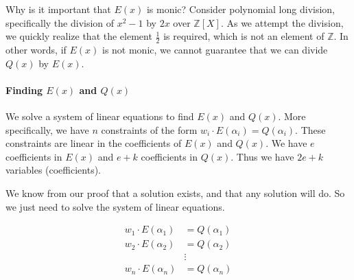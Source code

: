 \begin{bclogo}[logo=\bcquestion]{Why is it important that $E(x)$ is monic?}
    Consider polynomial long division, specifically 
    the division of $x^2-1$ by $2x$ over $\mathbb{Z}[X]$. 
    As we attempt the division, we quickly realize that the element 
    $\frac{1}{2}$ is required, which is not an element of $\mathbb{Z}$. 
    In other words, if $E(x)$ is not monic, we cannot guarantee 
    that we can divide $Q(x)$ by $E(x)$.
\end{bclogo}

\paragraph{Finding $E(x)$ and $Q(x)$}

We solve a system of linear equations to find $E(x)$ and $Q(x)$.
More specifically, we have $n$ constraints of the form $w_i\cdot E(\alpha_i)=Q(\alpha_i)$.
These constraints are linear in the coefficients of $E(x)$ and $Q(x)$.
We have $e$ coefficients in $E(x)$ and $e+k$ coefficients in $Q(x)$. Thus 
we have $2e+k$ variables (coefficients).

We know from our proof that a solution exists, and that any solution will do.
So we just need to solve the system of linear equations.

\begin{align*}
    w_1\cdot E(\alpha_1) &= Q(\alpha_1)\\
    w_2\cdot E(\alpha_2) &= Q(\alpha_2)\\
    &\vdots\\
    w_n\cdot E(\alpha_n) &= Q(\alpha_n)\\
\end{align*}


